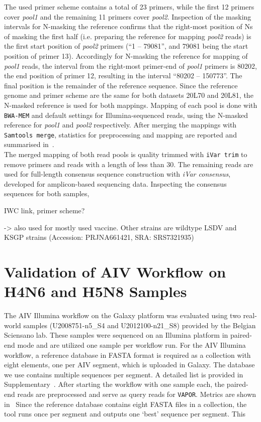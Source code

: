 The used primer scheme contains a total of 23 primers, while the first 12 primers cover \textit{pool1} and the remaining 11 primers cover \textit{pool2}. Inspection of the masking intervals for N-masking the reference confirms that the right-most position of Ns of masking the first half (i.e. preparing the reference for mapping \textit{pool2} reads) is the first start position of \textit{pool2} primers (``1 -- 79081'', and 79081 being the start position of primer 13). Accordingly for N-masking the reference for mapping of \textit{pool1} reads, the interval from the right-most primer-end of \textit{pool1} primers is 80202, the end position of primer 12, resulting in the interval ``80202 -- 150773''. The final position is the remainder of the reference sequence. Since the reference genome and primer scheme are the same for both datasets 20L70 and 20L81, the N-masked reference is used for both mappings. Mapping of each pool is done with \texttt{BWA-MEM} and default settings for Illumina-sequenced reads, using the N-masked reference for \textit{pool1} and \textit{pool2} respectively. After merging the mappings with \texttt{Samtools merge}, statistics for preprocessing and mapping are reported and summarised in~. \\
The merged mapping of both read pools is quality trimmed with \texttt{iVar trim} to remove primers and reads with a length of less than 30. The remaining reads are used for full-length consensus sequence construction with \textit{iVar consensus}, developed for amplicon-based sequencing data. Inspecting the consensus sequences for both samples, %

\todoit
\ac{IWC} link, primer scheme?

-> also used for mostly used vaccine. Other strains are wildtype LSDV and KSGP strains (Accession: PRJNA661421, SRA: SRS7321935)


\section{Validation of AIV Workflow on H4N6 and H5N8 Samples}\label{sec:4-aiv}
The AIV Illumina workflow on the Galaxy platform was evaluated using two real-world samples (U2008751-n5\_S4 and U2012100-n21\_S8) provided by the Belgian Sciensano lab. These samples were sequenced on an Illumina platform in paired-end mode and are utilized one sample per workflow run.  For the AIV Illumina workflow, a reference database in FASTA format is required as a collection with eight elements, one per AIV segment, which is uploaded in Galaxy. The database we use contains multiple sequences per segment. A detailed list is provided in Supplementary~.
After starting the workflow with one sample each, the paired-end reads are preprocessed and serve as query reads for \texttt{VAPOR}. Metrics are shown in~ Since the reference database contains eight FASTA files in a collection, the tool runs once per segment and outputs one `best' sequence per segment. This

